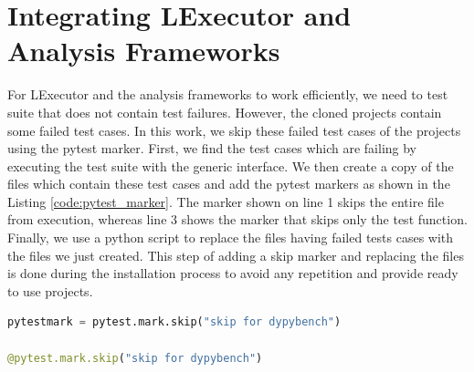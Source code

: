 \section{Integrating LExecutor and Analysis Frameworks}
For LExecutor and the analysis frameworks to work efficiently, we need to test suite that does not contain test failures.
However, the cloned projects contain some failed test cases.
In this work, we skip these failed test cases of the projects using the pytest marker.
First, we find the test cases which are failing by executing the test suite with the generic interface.
We then create a copy of the files which contain these test cases and add the pytest markers as shown in the Listing \ref{code:pytest_marker}.
The marker shown on line 1 skips the entire file from execution, whereas line 3 shows the marker that skips only the test function.
Finally, we use a python script to replace the files having failed tests cases with the files we just created.
This step of adding a skip marker and replacing the files is done during the installation process to avoid any repetition and provide ready to use projects.
\begin{lstlisting}[caption=Skip Test Case using Pytest Marker,label=code:pytest_marker,language=Python]
pytestmark = pytest.mark.skip("skip for dypybench")

@pytest.mark.skip("skip for dypybench")
\end{lstlisting}

